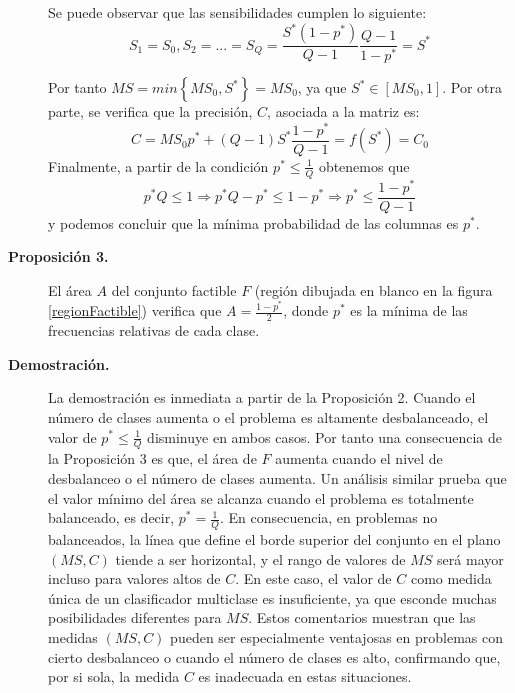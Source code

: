\begin{description}
Se puede observar que las sensibilidades cumplen lo siguiente:
\begin{displaymath}
S_{1}=S_{0}, S_{2}=...=S_{Q}=\frac{S^*(1-p^*)}{Q-1}
\frac{Q-1}{1-p^*}=S^*
\end{displaymath}

Por tanto $\displaystyle
MS=min\left\lbrace MS_{0},S^*\right\rbrace=MS_{0}$, ya que $\displaystyle S^*\in\left[
MS_{0},1\right]$. Por otra parte, se verifica que la precisión, $C$, asociada a la matriz
es:
\begin{displaymath}
C=MS_{0}p^*+(Q-1)S^* \frac{1-p^*}{Q-1}=f(S^*)=C_{0}
\end{displaymath}
Finalmente, a partir de la condición $\displaystyle p^*\leq \frac{1}{Q}$ obtenemos que
\begin{displaymath}
p^*Q\leq1 \Longrightarrow p^*Q-p^*\leq 1-p^*\Longrightarrow p^*\leq \frac{1-p^*}{Q-1}
\end{displaymath}
y podemos concluir que la mínima probabilidad de las columnas es $p^*$.
\item[\textbf{Proposición 3.}] El área $A$ del conjunto factible $F$ (región dibujada en
blanco en la figura \ref{regionFactible}) verifica que $\displaystyle A= \frac{1-p^*}{2}$,
donde $p^*$
es la mínima de las frecuencias relativas de cada clase.
\item[\textbf{Demostración.}] La demostración es inmediata a partir de la Proposición 2.
Cuando el número de clases aumenta o el problema es altamente desbalanceado, el valor de
$\displaystyle p^*\leq \frac{1}{Q}$ disminuye en ambos casos. Por tanto una consecuencia
de la Proposición 3 es que, el área de $F$ aumenta cuando el nivel de desbalanceo o el
número de clases aumenta. Un análisis similar prueba que el valor mínimo del área se
alcanza cuando el problema es totalmente balanceado, es decir, $\displaystyle p^*=
\frac{1}{Q}$. En consecuencia, en problemas no balanceados, la línea que define el borde
superior del conjunto en el plano $(MS,C)$
tiende a ser horizontal, y el rango de valores de $MS$ será mayor incluso para valores
altos de $C$. En este caso, el valor de $C$ como medida única de un clasificador
multiclase es insuficiente, ya que esconde muchas posibilidades diferentes para $MS$.
Estos comentarios muestran que las medidas $(MS,C)$ pueden ser especialmente ventajosas
en problemas con cierto desbalanceo o cuando el número de clases es alto, confirmando
que, por si sola, la medida $C$ es inadecuada en estas situaciones.


\end{description}
